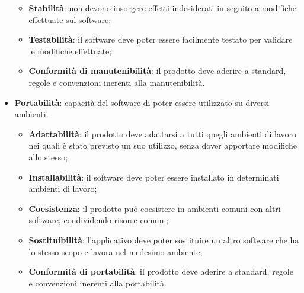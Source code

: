 \begin{itemize}
\begin{itemize}
\item\textbf{Stabilità}: non devono insorgere effetti indesiderati in seguito a modifiche effettuate sul software;
\item\textbf{Testabilità}: il software deve poter essere facilmente testato per validare le modifiche effettuate;
\item\textbf{Conformità di manutenibilità}: il prodotto deve aderire a standard, regole e convenzioni inerenti alla manutenibilità.
\end{itemize}
\item\textbf{Portabilità}: capacità del software di poter essere utilizzato su diversi ambienti.
\begin{itemize}
\item\textbf{Adattabilità}: il prodotto deve adattarsi a tutti quegli ambienti di lavoro nei quali è stato previsto un suo utilizzo, senza dover apportare modifiche allo stesso;
\item\textbf{Installabilità}: il software deve poter essere installato in determinati ambienti di lavoro;
\item\textbf{Coesistenza}: il prodotto può coesistere in ambienti comuni
con altri software, condividendo risorse comuni;
\item\textbf{Sostituibilità}: l'applicativo deve poter sostituire un altro software che ha lo stesso scopo e lavora nel medesimo ambiente;
\item\textbf{Conformità di portabilità}: il prodotto deve aderire a standard, regole e convenzioni inerenti alla portabilità.
\end{itemize}
\end{itemize}	